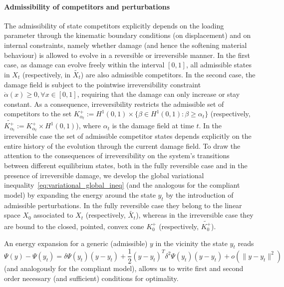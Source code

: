 \paragraph{Admissibility of competitors and perturbations}
The admissibility of state competitors explicitly depends on the loading parameter through the kinematic boundary conditions (on displacement) and on internal constraints, namely whether damage (and hence the softening material behaviour) is allowed to evolve in a reversible or irreversible manner.
In the first case, as damage can evolve freely within the interval $[0, 1]$, all admissible states in $X_t$  (respectively, in $\widetilde{X_t}$) are also admissible competitors. 
In the second case, the damage field is subject to the pointwise irreversibility constraint $\dot \alpha(x)\geq 0, \forall x\in [0, 1]$, requiring that the damage can only increase or stay constant. 
As a consequence, irreversibility restricts the admissible set of competitors to the set $K^+_{\alpha_t}:=H^1(0, 1) \times \{\beta\in H^1(0, 1): \beta\geq \alpha_t\}$ (respectively, $\widetilde{K^+_{\alpha_t}}:=K^+_{\alpha_t}\times H^1(0, 1)$), where $\alpha_t$ is the damage field at time $t$. In the irreversible case the set of admissible competitor states depends explicitly on the entire history of the evolution through the current damage field.
To draw the attention to the consequences of irreversibility on the system's transitions between different equilibrium states, both in the fully reversible case and in the presence of irreversible damage, we develop the global variational inequality~\eqref{eq:variational_global_ineq} (and the analogous for the compliant model) by expanding the energy around the state $y_t$ by the  introduction of admissible perturbations. 
In the fully reversible case they belong to the linear space $X_0$ associated to $X_t$ (respectively, $\widetilde{X_t}$), whereas in the irreversible case they are bound to the closed, pointed, convex cone $K^+_0$ (respectively, $\widetilde{K^+_0}$).

An energy expansion for a generic (admissible) $y$ in the vicinity the state $y_t$ reads
$$
\Psi(y)-\Psi(y_t)= \delta\Psi(y_t)(y-y_t)+\frac{1}{2}(y-y_t)^T \delta^2\Psi(y_t)(y-y_t)+o(\|y-y_t\|^2)
    \label{eqn:energy-expansion}
$$
(and analogously for the compliant model), allows us to write first and second order necessary (and sufficient) conditions for optimality.



